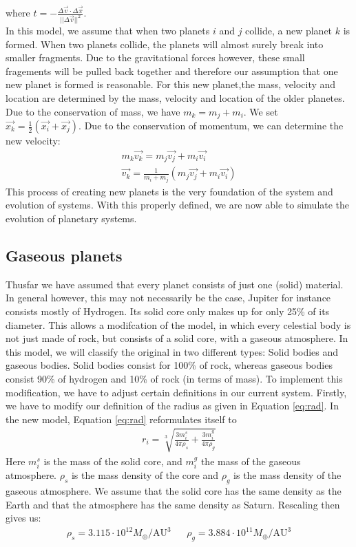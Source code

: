 where \(t= -\frac{\Delta\vec{v}\cdot \Delta\vec{x}}{||\Delta \vec{v}||^2}\).\\
In this model, we assume that when two planets \(i\) and \(j\) collide, a new planet \(k\) is formed. When two planets collide, the planets will almost surely break into smaller fragments. 
Due to the gravitational forces however, these small fragements will be pulled back together and therefore our assumption that one new planet is formed is reasonable.
For this new planet,the mass, velocity and location are determined by the mass, velocity and location of the older planetes. 
Due to the conservation of mass, we have \(m_k=m_j+m_i\). We set \(\vec{x_k}=\frac{1}{2}(\vec{x_i}+\vec{x_j})\). Due to the conservation of momentum, we can determine the new velocity: 
\begin{align*}
	m_k\vec{v_k}=m_j\vec{v_j}+m_i\vec{v_i}\\
	\vec{v_k}=\frac{1}{m_i+m_j}(m_j\vec{v_j}+m_i\vec{v_i})
\end{align*}
This process of creating new planets is the very foundation of the system and evolution of systems. With this properly defined, we are now able to simulate the evolution of planetary systems.
\subsection{Gaseous planets}
Thusfar we have assumed that every planet consists of just one (solid) material. 
In general however, this may not necessarily be the case, Jupiter for instance consists mostly of Hydrogen. Its solid core only makes up for only 25\% of its diameter.
This allows a modifcation of the model, in which every celestial body is not just made of rock, but consists of a solid core, with a gaseous atmosphere. 
In this model, we will classify the original in two different types: Solid bodies and gaseous bodies.
 Solid bodies consist for 100\% of rock, whereas gaseous bodies consist 90\% of hydrogen and 10\% of rock (in terms of mass). To implement this modification, we have to adjust certain definitions in our current system. Firstly, we have to modify our definition of the radius as given in Equation \eqref{eq:rad}. In the new model, Equation \eqref{eq:rad} reformulates itself to
 \begin{align*}
 r_i=\sqrt[3]{\frac{3 m_i^s}{4\pi \rho_s}+\frac{3 m_i^g}{4\pi \rho_g}}
 \end{align*}
 Here \(m_i^s\) is the mass of the solid core, and \(m_i^g\) the mass of the gaseous atmosphere. \(\rho_s\) is the mass density of the core and \(\rho_g\) is the mass density of the gaseous atmosphere. We assume that the solid core has the same density as the Earth and that the atmosphere has the same density as Saturn. Rescaling then gives us:
 \begin{align*}
 \rho_s =3.115\cdot 10^{12}{M_{\oplus}}/{\text{AU}^3} && \rho_g = 3.884\cdot 10^{11}{M_{\oplus}}/{\text{AU}^3}
 \end{align*}
